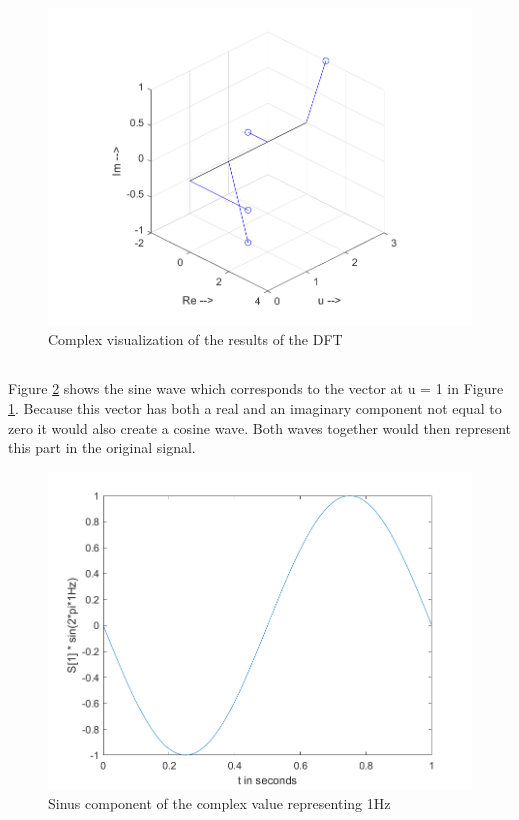\documentclass{article}
\begin{document}
\begin{figure}[H]
  \begin{center}
    \includegraphics[width=\textwidth]{./images/Stemcomplex.png}
    \caption{Complex visualization of the results of the DFT}
    \label{dft}
  \end{center}
\end{figure}

\subsection{}
Figure \ref{sin} shows the sine wave which corresponds to the vector at u = 1 in Figure \ref{dft}. Because this vector has both a real and an imaginary component not equal to zero it would also create a cosine wave. Both waves together would then represent this part in the original signal.
\begin{figure}[H]
  \begin{center}
    \includegraphics[width=\textwidth]{./images/Sinus.png}
    \caption{Sinus component of the complex value representing 1Hz}
    \label{sin}
  \end{center}
\end{figure}
\end{document}
